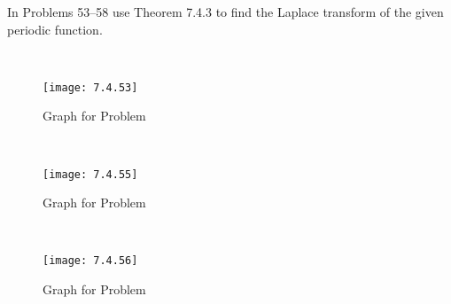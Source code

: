 \documentclass[chapter=7,section=4]{math252homework}
\begin{document}
In Problems 53--58 use Theorem 7.4.3 to find the Laplace transform of the given periodic function.
\begin{problems}[start=53]
	\problem~\begin{figure}[H]
				 \centering
				 \texttt{[image: 7.4.53]}
				 \caption{Graph for Problem }
				 \label{fig:meander-function}
	\end{figure}
	\setcounter{problemsi}{54}
	\problem~\begin{figure}[H]
				 \centering
				 \texttt{[image: 7.4.55]}
				 \caption{Graph for Problem }
				 \label{fig:sawtooth-function}
	\end{figure}
	\problem~\begin{figure}[H]
				 \centering
				 \texttt{[image: 7.4.56]}
				 \caption{Graph for Problem }
				 \label{fig:triangular-waveS}
	\end{figure}
\end{problems}
\end{document}

